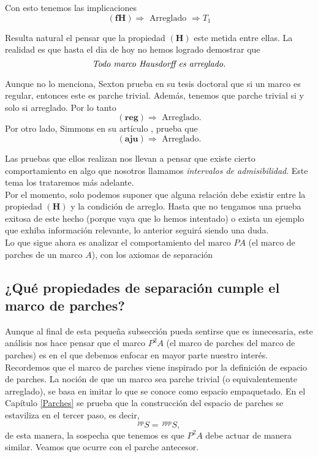 Con esto tenemos las implicaciones
\[
\mathbf{(fH)} \Rightarrow \mbox{ Arreglado }\Rightarrow T_1
\]

Resulta natural el pensar que la propiedad $\mathbf{(H)}$ este metida entre ellas. La realidad es que hasta el dia de hoy no hemos logrado demostrar que 
\[
\mbox{\emph{Todo marco Hausdorff es arreglado.}}
\]

Aunque no lo menciona, Sexton prueba en su tesis doctoral que si un marco es regular, entonces este es parche trivial. Además, tenemos que parche trivial si y solo si arreglado. Por lo tanto
\[
\mathbf{(reg)}\Rightarrow \mbox{ Arreglado.}
\] 
Por otro lado, Simmons en su artículo \cite{H.S.R}, prueba que 
\[
\mathbf{(aju)}\Rightarrow \mbox{ Arreglado.}
\]

Las pruebas que ellos realizan nos llevan a pensar que existe cierto comportamiento en algo que nosotros llamamos \emph{intervalos de admisibilidad}. Este tema los trataremos más adelante.\\

Por el momento, solo podemos suponer que alguna relación debe existir entre la propiedad $\mathbf{(H)}$ y la condición de arreglo. Hasta que no tengamos una prueba exitosa de este hecho (porque vaya que lo hemos intentado) o exista un ejemplo que exhiba información relevante,
lo anterior seguirá siendo una duda.\\

Lo que sigue ahora es analizar el comportamiento del marco $PA$ (el marco de parches de un marco $A$), con los axiomas de separación

\subsection{¿Qué propiedades de separación cumple el marco de parches?}\label{Parchesyseparación}

Aunque al final de esta pequeña subsección pueda sentirse que es innecesaria, este análisis nos hace pensar que el marco $P^2A$ (el marco de parches del marco de parches) es en el que debemos enfocar en mayor parte nuestro interés. Recordemos que el marco de parches viene inspirado por la definición de espacio de parches.
La noción de que un marco sea parche trivial (o equivalentemente arreglado), se basa en imitar lo que se conoce como espacio empaquetado. En el Capítulo \ref{Parches} se prueba que la construcción del espacio de parches se estaviliza en el tercer paso, es decir,
\[
^{pp}S=\,^{ppp}S,
\]
de esta manera, la sospecha que tenemos es que $P^2A$ debe actuar de manera similar. Veamos que ocurre con el parche antecesor.\\

